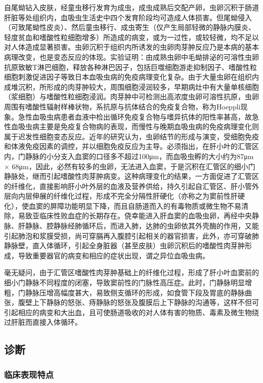 自尾蚴钻入皮肤，经童虫移行发育为成虫，成虫成熟后交配产卵，虫卵沉积于肠道肝脏等处组织内，血吸虫生活史中四个发育阶段均可造成人体损害。但尾蚴侵入（可致尾蚴性皮炎）、然后童虫移行、成虫寄生（仅产生局部轻微的静脉内膜炎、轻度贫血和嗜酸性粒细胞增多）所造成的病变，或为一过性，或较轻微，均不足以对人体造成显著损害。虫卵沉积于组织内所诱发的虫卵肉芽肿反应乃是本病的基本病理改变，也是变态反应的体现。实验证明：由成熟虫卵中毛蚴排泌的可溶性虫卵抗原致敏T淋巴细胞，释放各种淋巴因子，包括巨噬细胞游走抑制因子、嗜酸性粒细胞刺激促进因子等致日本血吸虫病的免疫病理变化复杂。由于大量虫卵在组织内成堆沉积，所形成的肉芽肿较大，周围细胞浸润较多，早期病灶中有大量单核细胞（浆细胞）与嗜酸性粒细胞浸润。肉芽肿中可检测出高浓度虫卵可溶性抗原，虫卵周围有嗜酸性辐射样棒状物，系抗原与抗体结合的免疫复合物，称为Hoeppli现象。急性血吸虫病患者血液中检出循环免疫复合物与嗜异抗体的阳性率甚高，故急性血吸虫病主要是免疫复合物病的表现，而慢性与晚期血吸虫病的免疫病理变化则属于迟发性细胞变态反应。近年的研究认为，虫卵结节的形成与演变，受细胞免疫和体液免疫因素的调控，并以细胞免疫反应为主导。必须指出，在肝小叶的汇管区内，门静脉的小分支入血窦的口径多不超过100μm，而血吸虫孵的大小约为87μm
×
68μm，因此，必然有较多的虫卵，无法进入血窦，于是沉积在汇管区的细小门静脉处，继而引起嗜酸性肉芽肿病变。这种病理变化的结果，一方面促进了汇管区的纤维化，直接影响肝小叶外层的血液及营养供给，持久引起自汇管区、肝小管外层向内层伸展的纤维化过程，形成不完全分隔性肝硬化（亦称之为窦前性肝硬化），使血窦的屏障功能明显下降，而且自肠道而入的有毒物质或微生物不易清除，易致亚临床性败血症的长期存在。侥幸能进入肝血窦的血吸虫卵，再经中央静脉、肝静脉、腔静脉经肺循环后，而进入肺，达肺的虫卵依其外壳酶的作用，又能引起肺泡和浆膜受损，尚可穿膈再入腹腔引起相关的器官损害，此外，亦可穿破肺静脉壁，直入体循环，引起全身脏器（甚至皮肤）虫卵沉积后的嗜酸性肉芽肿形成，导致重要器官的病变和相应的症状出现，谓之异位血吸虫病。

毫无疑问，由于汇管区嗜酸性肉芽肿基础上的纤维化过程，形成了肝小叶血窦前的细小门静脉不同程度的闭塞，导致窦前性的门脉性高压症。此时，门静脉明显增粗，门静脉压增高幅度甚大，易致侧支循环的形成，如食管下段及胃底的静脉曲张，腹壁上下静脉的怒张、痔静脉的怒张及腹膜后上下静脉的沟通等，这样不但可引起相应的病变和大出血，且可使肠道吸收的对人体有害的物质、毒素及微生物绕过肝脏而直接入体循环。

\subsection{诊断}

\subsubsection{临床表现特点}

